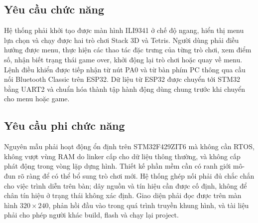 \subsection{Yêu cầu chức năng}

Hệ thống phải khởi tạo được màn hình ILI9341 ở chế độ ngang, hiển thị menu lựa chọn và chạy được hai trò chơi Stack 3D và Tetris. Người dùng phải điều hướng được menu, thực hiện các thao tác đặc trưng của từng trò chơi, xem điểm số, nhận biết trạng thái game over, khởi động lại trò chơi hoặc quay về menu. Lệnh điều khiển được tiếp nhận từ nút PA0 và từ bàn phím PC thông qua cầu nối Bluetooth Classic trên ESP32. Dữ liệu từ ESP32 được chuyển tới STM32 bằng UART2 và chuẩn hóa thành tập hành động dùng chung trước khi chuyển cho menu hoặc game.

\subsection{Yêu cầu phi chức năng}

Nguyên mẫu phải hoạt động ổn định trên STM32F429ZIT6 mà không cần RTOS, không vượt vùng RAM do linker cấp cho dữ liệu thông thường, và không cấp phát động trong vòng lặp dựng hình. Thiết kế phần mềm cần có ranh giới mô-đun rõ ràng để có thể bổ sung trò chơi mới. Hệ thống ghép nối phải đủ chắc chắn cho việc trình diễn trên bàn; dây nguồn và tín hiệu cần được cố định, không để chân tín hiệu ở trạng thái không xác định. Giao diện phải đọc được trên màn hình $320\times240$, phản hồi đầu vào trong quá trình truyền khung hình, và tài liệu phải cho phép người khác build, flash và chạy lại project.
